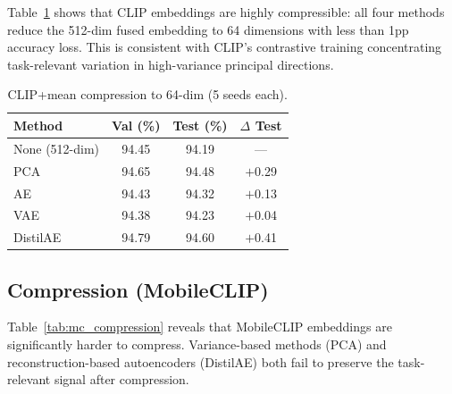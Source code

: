 \documentclass[10pt,twocolumn]{article}
\begin{document}
Table~\ref{tab:clip_compression} shows that CLIP embeddings are highly compressible:
all four methods reduce the 512-dim fused embedding to 64 dimensions with less than
1pp accuracy loss. This is consistent with CLIP's contrastive training concentrating
task-relevant variation in high-variance principal directions.

\begin{table}[h]
\centering
\caption{CLIP+mean compression to 64-dim (5 seeds each).}
\label{tab:clip_compression}
\begin{tabular}{lccc}
\toprule
Method & Val (\%) & Test (\%) & $\Delta$ Test \\
\midrule
None (512-dim)  & 94.45 & 94.19 & --- \\
PCA             & 94.65 & 94.48 & $+$0.29 \\
AE              & 94.43 & 94.32 & $+$0.13 \\
VAE             & 94.38 & 94.23 & $+$0.04 \\
DistilAE        & 94.79 & 94.60 & $+$0.41 \\
\bottomrule
\end{tabular}
\end{table}

\subsection{Compression (MobileCLIP)}

Table~\ref{tab:mc_compression} reveals that MobileCLIP embeddings are significantly
harder to compress. Variance-based methods (PCA) and reconstruction-based autoencoders
(DistilAE) both fail to preserve the task-relevant signal after compression.
\end{document}
